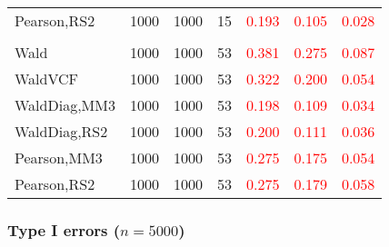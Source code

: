 \documentclass[
]{article}
\begin{document}
\begin{table}[H]
{\begin{tabular}[t]{lrrrrrr}
\hspace{1em}Pearson,RS2 & 1000 & 1000 & 15 & \textcolor{red}{0.193} & \textcolor{red}{0.105} & \textcolor{red}{0.028}\\
\addlinespace[0.3em]
\multicolumn{7}{l}{\textbf{3F 15V}}\\
\hspace{1em}Wald & 1000 & 1000 & 53 & \textcolor{red}{0.381} & \textcolor{red}{0.275} & \textcolor{red}{0.087}\\
\hspace{1em}WaldVCF & 1000 & 1000 & 53 & \textcolor{red}{0.322} & \textcolor{red}{0.200} & \textcolor{red}{0.054}\\
\hspace{1em}WaldDiag,MM3 & 1000 & 1000 & 53 & \textcolor{red}{0.198} & \textcolor{red}{0.109} & \textcolor{red}{0.034}\\
\hspace{1em}WaldDiag,RS2 & 1000 & 1000 & 53 & \textcolor{red}{0.200} & \textcolor{red}{0.111} & \textcolor{red}{0.036}\\
\hspace{1em}Pearson,MM3 & 1000 & 1000 & 53 & \textcolor{red}{0.275} & \textcolor{red}{0.175} & \textcolor{red}{0.054}\\
\hspace{1em}Pearson,RS2 & 1000 & 1000 & 53 & \textcolor{red}{0.275} & \textcolor{red}{0.179} & \textcolor{red}{0.058}\\
\bottomrule
\end{tabular}}
\endgroup{}
\end{table}

\hypertarget{type-i-errors-n5000-1}{%
\subsubsection{\texorpdfstring{Type I errors
(\(n=5000\))}{Type I errors (n=5000)}}\label{type-i-errors-n5000-1}}
\end{document}
